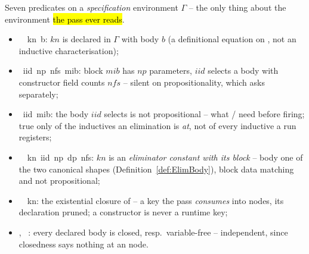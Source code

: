 \begin{definition}
\label{def:ElimDecl}
\leanok
{}
 Seven predicates on a \emph{specification} environment $\Gamma$ -- the only thing about
the environment \hl{the pass ever reads}.
\begin{itemize}
\item {}\ \Gamma\ kn\ b: $kn$ is declared in $\Gamma$ with body $b$ (a definitional
equation on , not an inductive characterisation);
\item {}\ iid\ np\ nfs\ mib: block $mib$ has $np$ parameters, $iid$ selects a body with
constructor field counts $nfs$ -- silent on propositionality, which  asks separately;
\item {}\ iid\ mib: the body $iid$ selects is not propositional -- what
/ need before firing; true only of the inductives an elimination is
\emph{at}, not of every inductive a run registers;
\item {}\ \Gamma\ kn\ iid\ np\ dp\ nfs: $kn$ is an \emph{eliminator constant with its
block} -- body one of the two canonical shapes (Definition~\ref{def:ElimBody}), block data matching
and not propositional;
\item {}\ \Gamma\ kn: the existential closure of  -- a key the pass
\emph{consumes} into  nodes, its declaration pruned; a constructor is never a runtime key;
\item {}, \ \Gamma: every declared body is closed, resp.\
variable-free -- independent, since closedness says nothing at an  node.
\end{itemize}
\end{definition}

